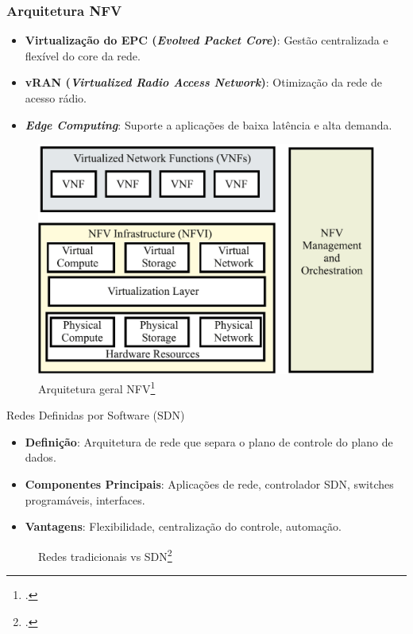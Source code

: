 \begin{frame}
    \frametitle{Arquitetura NFV}
    \begin{itemize}
        \item \textbf{Virtualização do EPC (\textit{Evolved Packet Core})}: Gestão centralizada e flexível do core da rede.
        \item \textbf{vRAN (\textit{Virtualized Radio Access Network})}: Otimização da rede de acesso rádio.
        \item \textbf{\textit{Edge Computing}}: Suporte a aplicações de baixa latência e alta demanda.
    \end{itemize}
    \begin{figure}
        \centering
        \includegraphics[width=0.45\linewidth]{figs/ArquiteturaNFV.png}
        \caption{Arquitetura geral NFV\footcite{NFV_architecture}}
    \end{figure}
\end{frame}

\begin{frame}{Redes Definidas por Software (SDN)}
    \begin{itemize}
        \item \textbf{Definição}: Arquitetura de rede que separa o plano de controle do plano de dados.
        \item \textbf{Componentes Principais}: Aplicações de rede, controlador SDN, switches programáveis, interfaces.
        \item \textbf{Vantagens}: Flexibilidade, centralização do controle, automação.
    \end{itemize}
    \begin{figure}
        \centering
        \qquad
        \caption{Redes tradicionais vs SDN\footcite{Plane_Separation}}
        \end{figure}
\end{frame}

